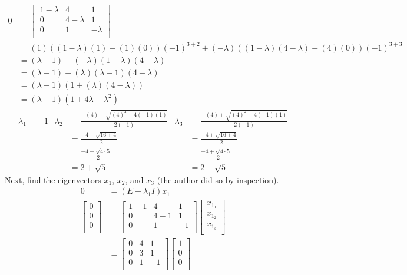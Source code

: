 \documentclass[titlepage]{article}
\begin{document}
\begin{align*}
    0 &=
    \begin{vmatrix}
        1-\lambda & 4 & 1\\
        0 & 4-\lambda & 1\\
        0 & 1 & -\lambda\\
    \end{vmatrix}\\
    &= (1)((1-\lambda)(1)-(1)(0))(-1)^{3+2}+(-\lambda)((1-\lambda)(4-\lambda)-(4)(0))(-1)^{3+3}\\
    &= (\lambda-1)+(-\lambda)(1-\lambda)(4-\lambda)\\
    &= (\lambda-1)+(\lambda)(\lambda-1)(4-\lambda)\\
    &= (\lambda-1)(1+(\lambda)(4-\lambda))\\
    &= (\lambda-1)(1+4\lambda-\lambda^2)
\end{align*}
\begin{align*}
    \lambda_1 &= 1&
        \lambda_2 &= \frac{-(4)-\sqrt{(4)^2-4(-1)(1)}}{2(-1)}&
            \lambda_3 &= \frac{-(4)+\sqrt{(4)^2-4(-1)(1)}}{2(-1)}\\
    &&
        &= \frac{-4-\sqrt{16+4}}{-2}&
            &= \frac{-4+\sqrt{16+4}}{-2}\\
    &&
        &= \frac{-4-\sqrt{4\cdot 5}}{-2}&
            &= \frac{-4+\sqrt{4\cdot 5}}{-2}\\
    &&
        &= 2+\sqrt{5}&
            &= 2-\sqrt{5}
\end{align*}
Next, find the eigenvectors $x_1$, $x_2$, and $x_3$ (the author did so by inspection).
\begin{align*}
    0 &= (E-\lambda_1I)x_1\\
    \begin{bmatrix}
        0\\
        0\\
        0\\
    \end{bmatrix}
    &=
    \begin{bmatrix}
        1-1 & 4 & 1\\
        0 & 4-1 & 1\\
        0 & 1 & -1\\
    \end{bmatrix}
    \begin{bmatrix}
        x_{1_1}\\
        x_{1_2}\\
        x_{1_3}\\
    \end{bmatrix}\\
    &=
    \begin{bmatrix}
        0 & 4 & 1\\
        0 & 3 & 1\\
        0 & 1 & -1\\
    \end{bmatrix}
    \begin{bmatrix}
        1\\
        0\\
        0\\
    \end{bmatrix}
\end{align*}
\end{document}
